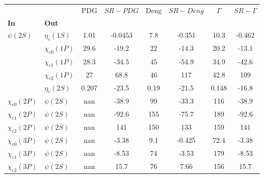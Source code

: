 \begin{tabular}{l|l|c|c|c|c|c|c}
\toprule
                &            &   PDG & $SR-PDG$ &  Deng & $SR-Deng$ &  $\Gamma$ & $SR-\Gamma$ \\
\textbf{In} & \textbf{Out} &       &          &       &           &           &             \\
\midrule
\textbf{$\psi(2S)$} & \textbf{$\eta_{c}(1S)$} &  1.01 &  -0.0453 &   7.8 &    -0.351 &      10.3 &      -0.462 \\
                & \textbf{$\chi_{c0}(1P)$} &  29.6 &    -19.2 &    22 &     -14.3 &      20.2 &       -13.1 \\
                & \textbf{$\chi_{c1}(1P)$} &  28.3 &    -34.5 &    45 &     -54.9 &      34.9 &       -42.6 \\
                & \textbf{$\chi_{c2}(1P)$} &    27 &     68.8 &    46 &       117 &      42.8 &         109 \\
                & \textbf{$\eta_{c}(2S)$} & 0.207 &    -23.5 &  0.19 &     -21.5 &     0.148 &       -16.8 \\
\textbf{$\chi_{c0}(2P)$} & \textbf{$\psi(2S)$} &   nan &    -38.9 &    99 &     -33.3 &       116 &       -38.9 \\
\textbf{$\chi_{c1}(2P)$} & \textbf{$\psi(2S)$} &   nan &    -92.6 &   155 &     -75.7 &       189 &       -92.6 \\
\textbf{$\chi_{c2}(2P)$} & \textbf{$\psi(2S)$} &   nan &      141 &   150 &       133 &       159 &         141 \\
\textbf{$\chi_{c0}(3P)$} & \textbf{$\psi(2S)$} &   nan &    -3.38 &   9.1 &    -0.425 &      72.4 &       -3.38 \\
\textbf{$\chi_{c1}(3P)$} & \textbf{$\psi(2S)$} &   nan &    -8.53 &    74 &     -3.53 &       179 &       -8.53 \\
\textbf{$\chi_{c2}(3P)$} & \textbf{$\psi(2S)$} &   nan &     15.7 &    76 &      7.66 &       156 &        15.7 \\
\bottomrule
\end{tabular}
